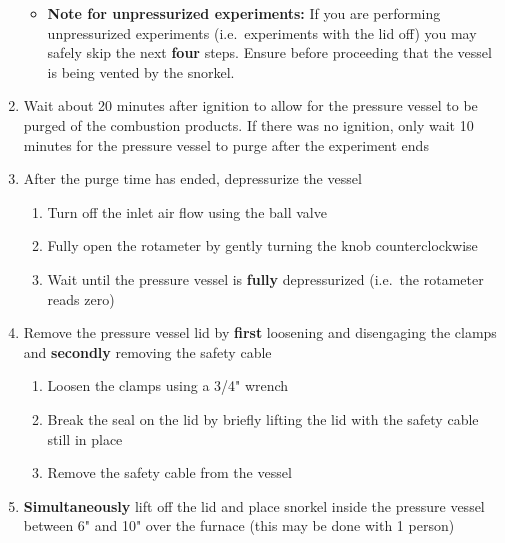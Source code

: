 \begin{enumerate}
  \begin{itemize}
  \tightlist
  \item
    \textbf{Note for unpressurized experiments:} If you are performing
    unpressurized experiments (i.e.~experiments with the lid off) you
    may safely skip the next \textbf{four} steps. Ensure before
    proceeding that the vessel is being vented by the snorkel.
  \end{itemize}
\item
  Wait about 20 minutes after ignition to allow for the pressure vessel
  to be purged of the combustion products. If there was no ignition,
  only wait 10 minutes for the pressure vessel to purge after the
  experiment ends
\item
  After the purge time has ended, depressurize the vessel

  \begin{enumerate}
  \def\labelenumii{\arabic{enumii}.}
  \tightlist
  \item
    Turn off the inlet air flow using the ball valve
  \item
    Fully open the rotameter by gently turning the knob counterclockwise
  \item
    Wait until the pressure vessel is \textbf{fully} depressurized
    (i.e.~the rotameter reads zero)
  \end{enumerate}
\item
  Remove the pressure vessel lid by \textbf{first} loosening and
  disengaging the clamps and \textbf{secondly} removing the safety cable

  \begin{enumerate}
  \def\labelenumii{\arabic{enumii}.}
  \tightlist
  \item
    Loosen the clamps using a 3/4" wrench
  \item
    Break the seal on the lid by briefly lifting the lid with the safety
    cable still in place
  \item
    Remove the safety cable from the vessel
  \end{enumerate}
\item
  \textbf{Simultaneously} lift off the lid and place snorkel inside the
  pressure vessel between 6" and 10" over the furnace (this may be done
  with 1 person)


\end{enumerate}
